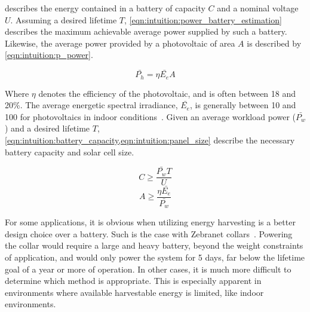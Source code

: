 \noindent 
{} describes the energy contained in a battery of capacity $C$ and a nominal voltage $U$. 
Assuming a desired lifetime $T$, \cref{eqn:intuition:power_battery_estimation} describes the maximum achievable average power supplied by such a battery. 
Likewise, the average power provided by a photovoltaic of area $A$ is described by \cref{eqn:intuition:p_power}. 

\begin{equation} \label{eqn:intuition:p_power}
\bar{P_h} = \eta \bar{E_e} A 
\end{equation}

\noindent 
Where 
$\eta$ denotes the efficiency of the photovoltaic, and is often between 18 and 20\%. 
The average energetic spectral irradiance, $\bar{E_e}$, is generally between 10 and 100\ssi{\micro\watt\per\centi\meter\squared} for photovoltaics in indoor conditions~\cite{yervaGrafting12,gorlatova2013networking}. 
Given an average workload power ($\bar{P_w}$) and a desired lifetime $T$, 
\cref{eqn:intuition:battery_capacity,eqn:intuition:panel_size}
describe the necessary battery capacity and solar cell size.

\begin{equation} \label{eqn:intuition:battery_capacity}
    C \geq \frac{\bar{P_w} T}{U}
\end{equation}
\begin{equation} \label{eqn:intuition:panel_size}
    A \geq \frac{\eta \bar{E_e}}{\bar{P_w}}
\end{equation}

For some applications, it is obvious when utilizing energy harvesting is a better design choice over a battery. 
Such is the case with Zebranet collars~\cite{juang2002energy}. Powering the collar would require a large and heavy battery, beyond the weight constraints of application, and would only power the system for 5 days, far below the lifetime goal of a year or more of operation.
In other cases, it is much more difficult to determine which method is appropriate.
This is especially apparent in environments where available harvestable energy is limited, like indoor environments. 


